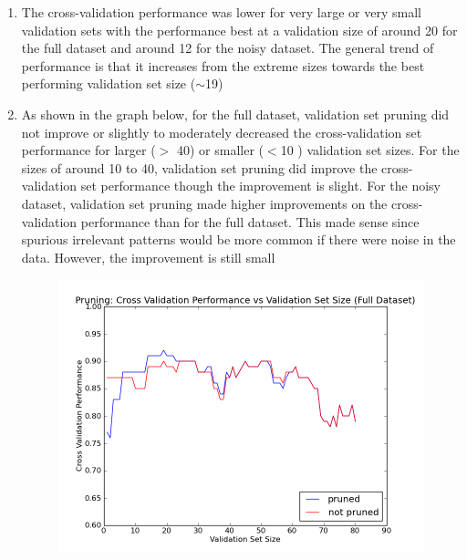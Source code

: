 \documentclass[12pt]{article}
\begin{document}
\begin{enumerate}
\begin{enumerate}
\begin{enumerate}
\begin{figure}[H]
\begin{center}
							\end{center}
						\end{figure}
					\item The cross-validation performance was lower for very large or very small validation sets with the performance best at a validation size of around 20 for the full dataset and around 12 for the noisy dataset. The general trend of performance is that it increases from the extreme sizes towards the best performing validation set size ($\sim$19)
					\item As shown in the graph below, for the full dataset, validation set pruning did not improve or slightly to moderately decreased the cross-validation set performance for larger ($>$ 40) or smaller ($<$10 ) validation set sizes. For the sizes of around 10 to 40, validation set pruning did improve the cross-validation set performance though the improvement is slight. For the noisy dataset, validation set pruning made higher improvements on the cross-validation performance than for the full dataset. This made sense since spurious irrelevant patterns would be more common if there were noise in the data. However, the improvement is still small\\
					\begin{figure}[H]
							\begin{center}
							\includegraphics[width=130mm]{2biii1.png}
							\end{center}
						\end{figure}
						\begin{figure}[H]
							\begin{center}

\end{center}
\end{figure}
\end{enumerate}
\end{enumerate}
\end{enumerate}
\end{document}
